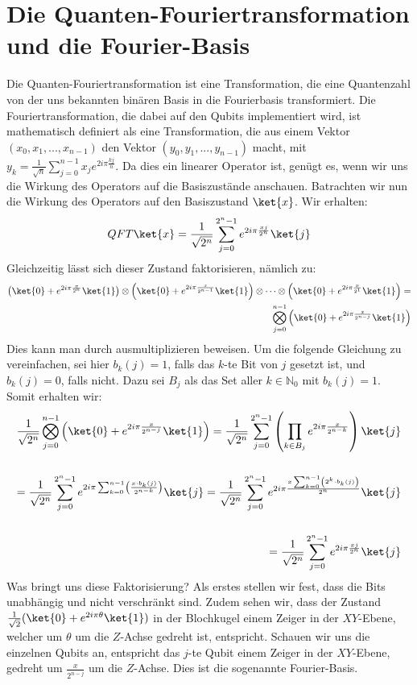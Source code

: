 \section{Die Quanten-Fouriertransformation und die Fourier-Basis}
Die Quanten-Fouriertransformation ist eine Transformation, die eine Quantenzahl von der uns bekannten binären Basis in die Fourierbasis transformiert. Die Fouriertransformation, die dabei auf den Qubits implementiert wird, ist mathematisch definiert als eine Transformation, die aus einem Vektor $(x_0, x_1, ..., x_{n - 1})$ den Vektor $(y_0, y_1, ..., y_{n - 1})$ macht, mit $y_k = \frac{1}{\sqrt{n}}\sum_{j = 0}^{n - 1}x_je^{2i\pi\frac{kj}{n}}$. Da dies ein linearer Operator ist, genügt es, wenn wir uns die Wirkung des Operators auf die Basiszustände anschauen. Batrachten wir nun die Wirkung des Operators auf den Basiszustand $\ket{x}$. Wir erhalten:
$$QFT\ket{x} = \frac{1}{\sqrt{2^n}}\sum^{2^n - 1}_{j = 0}e^{2i\pi\frac{xj}{2^n}}\ket{j}$$
Gleichzeitig lässt sich dieser Zustand faktorisieren, nämlich zu:
\begin{align*}
\left(\ket{0} + e^{2i\pi\frac{x}{2^{n}}}\ket{1}\right)\otimes\left(\ket{0} + e^{2i\pi\frac{x}{2^{n - 1}}}\ket{1}\right)\otimes\cdots\otimes\left(\ket{0} + e^{2i\pi\frac{x}{2^{1}}}\ket{1}\right) = \\ \bigotimes_{j = 0}^{n - 1}\left(\ket{0} + e^{2i\pi\frac{x}{2^{n - j}}}\ket{1}\right)
\end{align*}
Dies kann man durch ausmultiplizieren beweisen. Um die folgende Gleichung zu vereinfachen, sei hier $b_k(j) = 1$, falls das $k$-te Bit von $j$ gesetzt ist, und $b_k(j) = 0$, falls nicht. Dazu sei $B_j$ als das Set aller $k \in \mathbb{N}_0$ mit $b_k(j) = 1$. Somit erhalten wir:
\begin{align*}
\frac{1}{\sqrt{2^n}}\bigotimes_{j = 0}^{n - 1}\left(\ket{0} + e^{2i\pi\frac{x}{2^{n - j}}}\ket{1}\right) = \frac{1}{\sqrt{2^n}}\sum_{j = 0}^{2^n - 1}\left(\prod_{k \in B_j}e^{2i\pi\frac{x}{2^{n - k}}}\right)\ket{j} \\ \\
= \frac{1}{\sqrt{2^n}}\sum_{j = 0}^{2^n - 1}e^{2i\pi\sum_{k = 0}^{n - 1}\left(\frac{x \cdot b_k(j)}{2^{n - k}}\right)}\ket{j} = \frac{1}{\sqrt{2^n}}\sum_{j = 0}^{2^n - 1}e^{2i\pi\frac{x\sum_{k = 0}^{n - 1}\left(2^k\cdot b_k(j)\right)}{2^n}}\ket{j} \\ \\
= \frac{1}{\sqrt{2^n}}\sum_{j = 0}^{2^n - 1}e^{2i\pi\frac{xj}{2^n}}\ket{j}
\end{align*}
Was bringt uns diese Faktorisierung? Als erstes stellen wir fest, dass die Bits unabhängig und nicht verschränkt sind. Zudem sehen wir, dass der Zustand $\frac{1}{\sqrt{2}}(\ket{0} + e^{2i\pi\theta}\ket{1})$ in der Blochkugel einem Zeiger in der $XY$-Ebene, welcher um $\theta$ um die $Z$-Achse gedreht ist, entspricht. Schauen wir uns die einzelnen Qubits an, entspricht das $j$-te Qubit einem Zeiger in der $XY$-Ebene, gedreht um $\frac{x}{2^{n - j}}$ um die $Z$-Achse. Dies ist die sogenannte Fourier-Basis.


